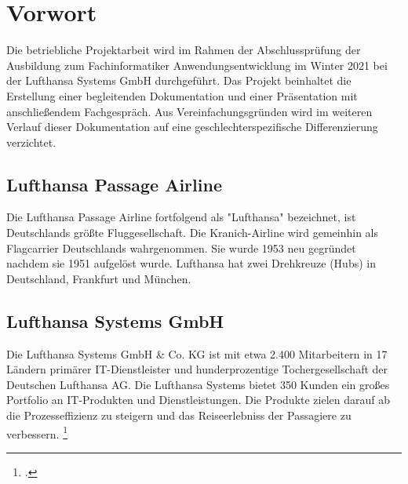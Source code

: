 \section{Vorwort}

	Die betriebliche Projektarbeit wird im Rahmen der Abschlussprüfung der Ausbildung zum
	Fachinformatiker Anwendungsentwicklung im Winter 2021 bei der Lufthansa Systems GmbH durchgeführt.
	Das Projekt beinhaltet die Erstellung einer begleitenden
	Dokumentation und einer Präsentation mit anschließendem Fachgespräch. Aus Vereinfachungsgründen wird im weiteren Verlauf dieser Dokumentation auf eine geschlechterspezifische
	Differenzierung verzichtet.


	\subsection{Lufthansa Passage Airline}
	Die Lufthansa Passage Airline fortfolgend als "Lufthansa" bezeichnet, ist Deutschlands größte Fluggesellschaft. Die Kranich-Airline wird gemeinhin als Flagcarrier Deutschlands wahrgenommen. Sie wurde 1953 neu gegründet nachdem sie 1951 aufgelöst wurde. Lufthansa hat zwei Drehkreuze (Hubs) in Deutschland, Frankfurt und München.

	\subsection{Lufthansa Systems GmbH}
	Die Lufthansa Systems GmbH \& Co. KG ist mit etwa 2.400 Mitarbeitern in 17 Ländern primärer IT-Dienstleister und hunderprozentige Tochergesellschaft der Deutschen Lufthansa AG.
	Die Lufthansa Systems bietet 350 Kunden ein großes Portfolio an IT-Produkten und Dienstleistungen. Die Produkte zielen darauf ab die Prozesseffizienz zu steigern und das Reiseerlebniss der Passagiere zu verbessern.
	\footcite{1}

